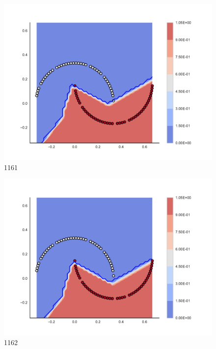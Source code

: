 \begin{subfigure}[b]{0.09\textwidth}
    \includegraphics[width=\textwidth]{img/convergence/1161.pdf}
    \caption{1161}
    \label{fig:convergence_1161}
\end{subfigure}
%
\begin{subfigure}[b]{0.09\textwidth}
    \includegraphics[width=\textwidth]{img/convergence/1162.pdf}
    \caption{1162}
    \label{fig:convergence_1162}
\end{subfigure}
%
